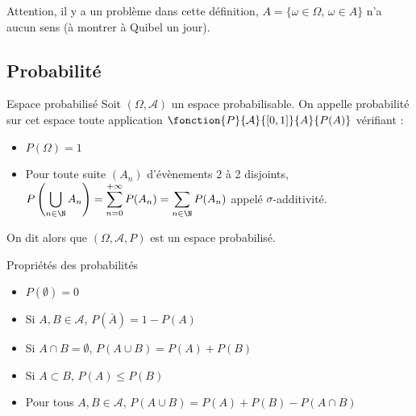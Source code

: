 Attention, il y a un problème dans cette définition, $A = \{ \omega \in \Omega, \, \omega \in A\}$ 
n'a aucun sens (à montrer à Quibel un jour).

\subsection{Probabilité}

\begin{definition}{Espace probabilisé}{}
    Soit $(\Omega, \mathcal A)$ un espace probabilisable. On appelle probabilité 
    sur cet espace toute application $\fonction{P}{\mathcal A}{[0, 1]}{A}{P(A)}$
    vérifiant :
    \begin{itemize}
        \item $P(\Omega) = 1$
        \item Pour toute suite $(A_n)$ d'évènements 2 à 2 disjoints, 
        $\displaystyle P\left( \bigcup_{n \in \N} A_n \right) = \sum_{n = 0 }^{+\infty    } P(A_n ) = \sum_{n \in \N    } P(A_n)$
        appelé $\sigma$-additivité.
    \end{itemize}

    On dit alors que $(\Omega, \mathcal A, P)$ est un espace probabilisé. 
\end{definition}

\begin{proposition}{Propriétés des probabilités}{}
    \begin{itemize}
        \item $P(\emptyset) = 0$
        \item Si $A, B \in \mathcal A$, $P(\bar A) = 1 - P(A)$
        \item Si $A \cap B = \emptyset$, $P(A \cup B) = P(A) + P(B)$
        \item Si $A \subset B$, $P(A) \leqslant P(B)$
        \item Pour tous $A, B \in \mathcal A$, $P(A \cup B) = P(A) + P(B) - P(A \cap B)$
    \end{itemize}
\end{proposition}

